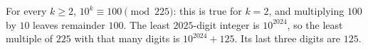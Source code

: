 For every $k\ge2$, $10^k\equiv100\pmod{225}$: this is true for $k=2$, and multiplying $100$ by $10$ leaves remainder $100$. The least $2025$-digit integer is $10^{2024}$, so the least multiple of $225$ with that many digits is $10^{2024}+125$. Its last three digits are $\boxed{125}$.
